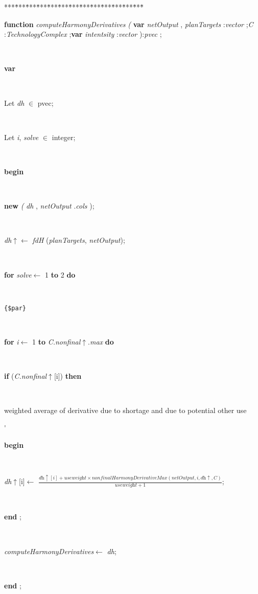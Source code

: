 \begin{tabbing}
***\=***\=***\=***\=***\=***\=***\=***\=***\=***\=***\=***\=***\=\kill
\parbox{14cm}{\textsf{\textbf{function}  \textit{computeHarmonyDerivatives} \textit{(} \textbf{var}  \textit{netOutput} , \textit{planTargets} :\textit{vector} ;\textit{C} :\textit{TechnologyComplex} ;\textbf{var}  \textit{intentsity} :\textit{vector} ):\textit{pvec}  ;}}\\
\+\parbox{14cm}{\textsf{\textbf{var} }}\\
\parbox{14cm}{\textsf{Let \textit{dh} $\in$ pvec;}}\\
\parbox{14cm}{\textsf{Let \textit{i}, \textit{solve} $\in$ integer;}}\\
\-\<\+\parbox{14cm}{\textsf{\textbf{begin} }}\\
\parbox{14cm}{\textsf{\textbf{new} \textit{(} \textit{dh} ,  \textit{netOutput} .\textit{cols} );}}\\
\parbox{14cm}{\textsf{\textit{dh}$\uparrow$\textit{}$\leftarrow$ \textit{fdH} (\textit{planTargets}, \textit{netOutput})}; }\\
\+\parbox{14cm}{\textsf {\textbf {for } \textsf{\textit{solve}$\leftarrow$ 1} \textbf{ to } \textsf{2} \textbf{ do } }}\\
\parbox{14cm}{\texttt{\small{\{\$par\}}}}\\
\+\parbox{14cm}{\textsf {\textbf {for } \textsf{\textit{i}$\leftarrow$ 1} \textbf{ to } \textsf{\textit{C.nonfinal}$\uparrow$.\textit{max}} \textbf{ do } }}\\
\+\parbox{14cm}{\textsf {\textbf {if } \textsf{(\textit{C.nonfinal}$\uparrow$\textit{}[i])} \textbf{ then } }}\\
\<\<\<\<\parbox{3.5cm}{\scriptsize{weighted average of derivative due to shortage and due to potential other use}}\'\>\>\>\parbox{14cm}{\textsf{\textbf{begin} }}\\
\parbox{14cm}{\textsf{\textit{dh}$\uparrow$\textit{}[i]$\leftarrow$ $\frac{\textit{dh}\uparrow\textit{}[\textit{i}] + \textit{useweight} \times \textit{nonfinalHarmonyDerivativeMax} (\textit{netOutput}, \textit{i}, \textit{dh}\uparrow\textit{}, \textit{C})}{\textit{useweight} + 1}$}; }\\
\<\-\parbox{14cm}{\textsf{\textbf{end} ;}}\\
\parbox{14cm}{\textsf{\textit{computeHarmonyDerivatives}$\leftarrow$ \textit{dh}}; }\\
\<\-\<\-\<\-\parbox{14cm}{\textsf{\textbf{end} ;}}\\
\end{tabbing}
